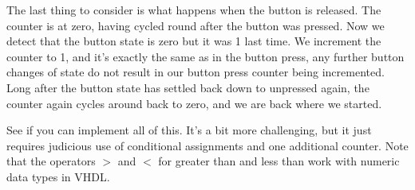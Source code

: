 \documentclass[../physical_computing.tex]{subfiles}
\begin{document}
The last thing to consider is what happens when the button is released. The counter is at zero, having cycled round after the button was pressed. Now we detect that the button state is zero but it was 1 last time. We increment the counter to 1, and it's exactly the same as in the button press, any further button changes of state do not result in our button press counter being incremented. Long after the button state has settled back down to unpressed again, the counter again cycles around back to zero, and we are back where we started.

See if you can implement all of this. It's a bit more challenging, but it just requires judicious use of conditional assignments and one additional counter. Note that the operators $>$ and $<$ for greater than and less than work with numeric data types in VHDL.
\end{document}
